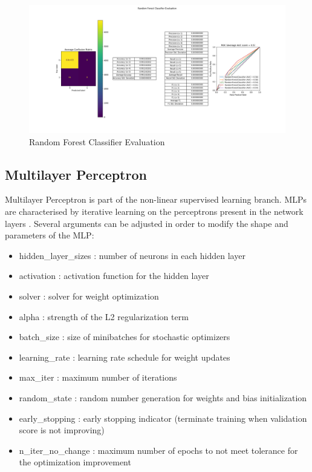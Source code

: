\begin{figure}
    \center
    \includegraphics[scale=0.32]{img/rfc_d.png}
    \caption{Random Forest Classifier Evaluation}
    \label{rfc_d}
\end{figure}

\subsection{Multilayer Perceptron}
Multilayer Perceptron is part of the non-linear supervised learning branch.
MLPs are characterised by iterative learning on the perceptrons present in the
network layers \cite{mlp_scikit}. Several arguments can be adjusted in order to
modify the shape and parameters of the MLP:\\

\begin{itemize}
    \item hidden\_layer\_sizes : number of neurons in each hidden layer
    \item activation : activation function for the hidden layer
    \item solver : solver for weight optimization
    \item alpha : strength of the L2 regularization term
    \item batch\_size : size of minibatches for stochastic optimizers
    \item learning\_rate : learning rate schedule for weight updates
    \item max\_iter : maximum number of iterations
    \item random\_state : random number generation for weights and bias
          initialization
    \item early\_stopping : early stopping indicator (terminate training when
          validation score is not improving)
    \item n\_iter\_no\_change : maximum number of epochs to not meet tolerance
          for the optimization improvement
\end{itemize}

